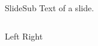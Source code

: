 \documentclass{ctexbeamer}
\begin{document}
\begin{frame}
\titlepage
\end{frame}

\begin{frame}{Slide}{Sub}
Text of a slide.
\begin{columns}
Left
Right
\end{columns}
\end{frame}
\end{document}
